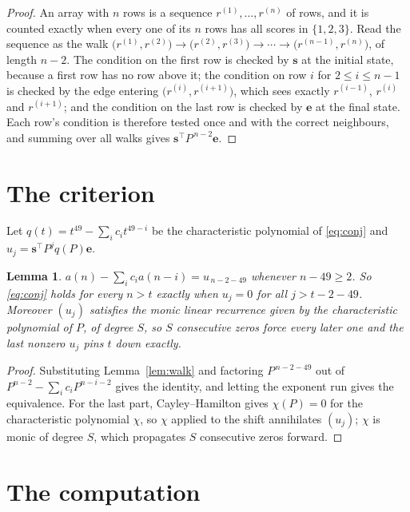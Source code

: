\documentclass[11pt,a4paper]{article}
\theoremstyle{plain}
\newtheorem{lemma}[theorem]{Lemma}
\theoremstyle{definition}
\begin{document}
\begin{proof}
An array with $n$ rows is a sequence $r^{(1)},\dots,r^{(n)}$ of rows, and it is counted
exactly when every one of its $n$ rows has all scores in $\{1,2,3\}$. Read the sequence as the
walk $\bigl(r^{(1)},r^{(2)}\bigr)\to\bigl(r^{(2)},r^{(3)}\bigr)\to\cdots\to
\bigl(r^{(n-1)},r^{(n)}\bigr)$, of length $n-2$. The condition on the first row is
checked by $\mathbf{s}$ at the initial state, because a first row has no row above it; the
condition on row $i$ for $2\le i\le n-1$ is checked by the edge entering
$\bigl(r^{(i)},r^{(i+1)}\bigr)$, which sees exactly $r^{(i-1)}$, $r^{(i)}$ and
$r^{(i+1)}$; and the condition on the last row is checked by $\mathbf{e}$ at the final
state. Each row's condition is therefore tested once and with the correct neighbours, and
summing over all walks gives $\mathbf{s}^{\!\top}P^{\,n-2}\mathbf{e}$.
\end{proof}

\section{The criterion}

Let $q(t)=t^{49}-\sum_i c_i t^{49-i}$ be the characteristic polynomial of
\eqref{eq:conj} and $u_j=\mathbf{s}^{\!\top}P^{j}q(P)\mathbf{e}$.

\begin{lemma}\label{lem:crit}
$a(n)-\sum_i c_i a(n-i)=u_{\,n-2-49}$ whenever $n-49\ge2$. So \eqref{eq:conj}
holds for every $n>t$ exactly when $u_j=0$ for all $j>t-2-49$. Moreover $(u_j)$
satisfies the monic linear recurrence given by the characteristic polynomial of $P$, of
degree $S$, so $S$ consecutive zeros force every later one and the last nonzero $u_j$ pins
$t$ down exactly.
\end{lemma}

\begin{proof}
Substituting Lemma~\ref{lem:walk} and factoring $P^{\,n-2-49}$ out of
$P^{n-2}-\sum_i c_i P^{n-i-2}$ gives the identity, and letting the exponent run gives the
equivalence. For the last part, Cayley--Hamilton gives $\chi(P)=0$ for the characteristic
polynomial $\chi$, so $\chi$ applied to the shift annihilates $(u_j)$; $\chi$ is monic of
degree $S$, which propagates $S$ consecutive zeros forward.
\end{proof}

\section{The computation}
\end{document}
